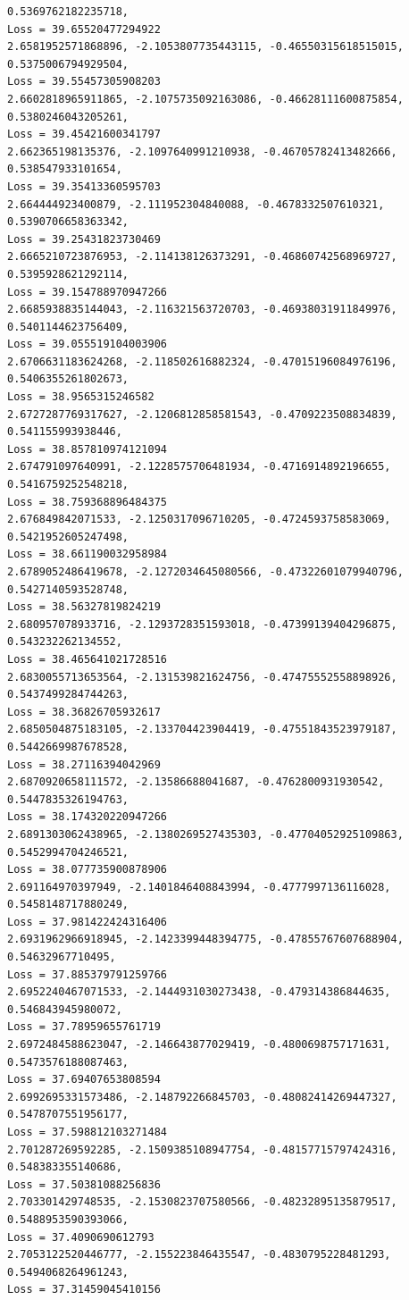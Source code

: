 \documentclass[11pt]{article}
\begin{document}
\begin{Verbatim}[commandchars=\\\{\}]
0.5369762182235718,
Loss = 39.65520477294922
2.6581952571868896, -2.1053807735443115, -0.46550315618515015,
0.5375006794929504,
Loss = 39.55457305908203
2.6602818965911865, -2.1075735092163086, -0.46628111600875854,
0.5380246043205261,
Loss = 39.45421600341797
2.662365198135376, -2.1097640991210938, -0.46705782413482666, 0.538547933101654,
Loss = 39.35413360595703
2.664444923400879, -2.111952304840088, -0.4678332507610321, 0.5390706658363342,
Loss = 39.25431823730469
2.6665210723876953, -2.114138126373291, -0.46860742568969727,
0.5395928621292114,
Loss = 39.154788970947266
2.6685938835144043, -2.116321563720703, -0.46938031911849976,
0.5401144623756409,
Loss = 39.055519104003906
2.6706631183624268, -2.118502616882324, -0.47015196084976196,
0.5406355261802673,
Loss = 38.9565315246582
2.6727287769317627, -2.1206812858581543, -0.4709223508834839, 0.541155993938446,
Loss = 38.857810974121094
2.674791097640991, -2.1228575706481934, -0.4716914892196655, 0.5416759252548218,
Loss = 38.759368896484375
2.676849842071533, -2.1250317096710205, -0.4724593758583069, 0.5421952605247498,
Loss = 38.661190032958984
2.6789052486419678, -2.1272034645080566, -0.47322601079940796,
0.5427140593528748,
Loss = 38.56327819824219
2.680957078933716, -2.1293728351593018, -0.47399139404296875, 0.543232262134552,
Loss = 38.465641021728516
2.6830055713653564, -2.131539821624756, -0.47475552558898926,
0.5437499284744263,
Loss = 38.36826705932617
2.6850504875183105, -2.133704423904419, -0.47551843523979187,
0.5442669987678528,
Loss = 38.27116394042969
2.6870920658111572, -2.13586688041687, -0.4762800931930542, 0.5447835326194763,
Loss = 38.174320220947266
2.6891303062438965, -2.1380269527435303, -0.47704052925109863,
0.5452994704246521,
Loss = 38.077735900878906
2.691164970397949, -2.1401846408843994, -0.4777997136116028, 0.5458148717880249,
Loss = 37.981422424316406
2.6931962966918945, -2.1423399448394775, -0.47855767607688904, 0.54632967710495,
Loss = 37.885379791259766
2.6952240467071533, -2.1444931030273438, -0.479314386844635, 0.546843945980072,
Loss = 37.78959655761719
2.6972484588623047, -2.146643877029419, -0.4800698757171631, 0.5473576188087463,
Loss = 37.69407653808594
2.6992695331573486, -2.148792266845703, -0.48082414269447327,
0.5478707551956177,
Loss = 37.598812103271484
2.701287269592285, -2.1509385108947754, -0.48157715797424316, 0.548383355140686,
Loss = 37.50381088256836
2.703301429748535, -2.1530823707580566, -0.48232895135879517,
0.5488953590393066,
Loss = 37.4090690612793
2.7053122520446777, -2.155223846435547, -0.4830795228481293, 0.5494068264961243,
Loss = 37.31459045410156

\end{Verbatim}
\end{document}
